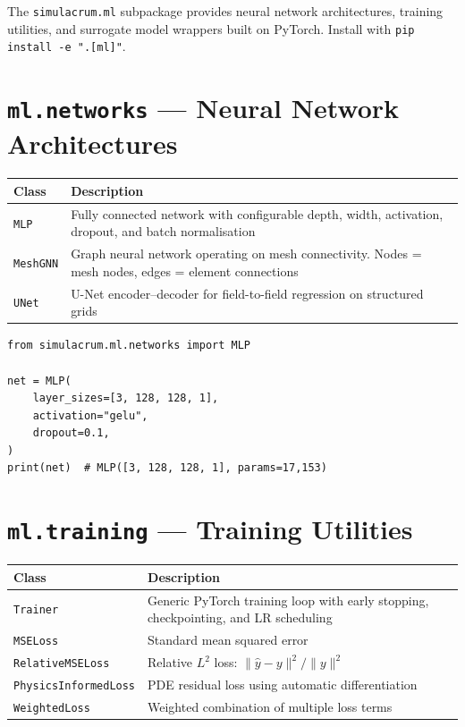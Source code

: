 \documentclass[11pt,a4paper]{report}
\begin{document}
The \texttt{simulacrum.ml} subpackage provides neural network architectures, training utilities, and surrogate model wrappers built on PyTorch. Install with \texttt{pip install -e ".[ml]"}.

\section{\texttt{ml.networks} --- Neural Network Architectures}

\begin{longtable}{lp{8cm}}
\toprule
\textbf{Class} & \textbf{Description} \\
\midrule
\texttt{MLP} & Fully connected network with configurable depth, width, activation, dropout, and batch normalisation \\
\texttt{MeshGNN} & Graph neural network operating on mesh connectivity. Nodes = mesh nodes, edges = element connections \\
\texttt{UNet} & U-Net encoder--decoder for field-to-field regression on structured grids \\
\bottomrule
\end{longtable}

\begin{lstlisting}[caption={Creating an MLP}]
from simulacrum.ml.networks import MLP

net = MLP(
    layer_sizes=[3, 128, 128, 1],
    activation="gelu",
    dropout=0.1,
)
print(net)  # MLP([3, 128, 128, 1], params=17,153)
\end{lstlisting}

\section{\texttt{ml.training} --- Training Utilities}

\begin{longtable}{lp{8cm}}
\toprule
\textbf{Class} & \textbf{Description} \\
\midrule
\texttt{Trainer} & Generic PyTorch training loop with early stopping, checkpointing, and LR scheduling \\
\texttt{MSELoss} & Standard mean squared error \\
\texttt{RelativeMSELoss} & Relative $L^2$ loss: $\|\hat{y} - y\|^2 / \|y\|^2$ \\
\texttt{PhysicsInformedLoss} & PDE residual loss using automatic differentiation \\
\texttt{WeightedLoss} & Weighted combination of multiple loss terms \\
\bottomrule
\end{longtable}
\end{document}
